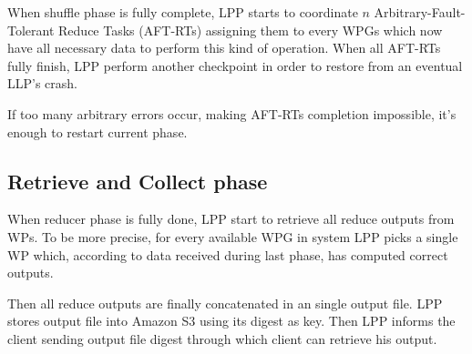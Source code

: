 \documentclass[sigchi]{acmart}
\begin{document}
When shuffle phase is fully complete, LPP starts to coordinate $n$ Arbitrary-Fault-Tolerant Reduce Tasks (AFT-RTs) assigning them to every WPGs which now have all necessary data to perform this kind of operation. When all AFT-RTs fully finish, LPP perform another checkpoint in order to restore from an eventual LLP's crash.

If too many arbitrary errors occur, making AFT-RTs completion impossible, it's enough to restart current phase.

\subsection{Retrieve and Collect phase}

When reducer phase is fully done, LPP start to retrieve all reduce outputs from WPs. To be more precise, for every available WPG in system LPP picks a single WP which, according to data received during last phase, has computed correct outputs.

Then all reduce outputs are finally concatenated in an single output file. LPP stores output file into Amazon S3 using its digest as key. Then LPP informs the client sending output file digest through which client can retrieve his output.






\appendix
\end{document}
